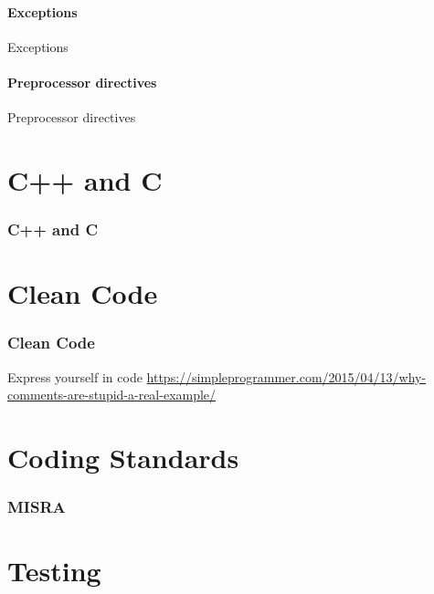 \documentclass{beamer}
\begin{document}
\subsection{Exceptions}
\begin{frame}{Exceptions}

\end{frame}

\subsection{Preprocessor directives}
\begin{frame}{Preprocessor directives}

\end{frame}


\part{C++ and C}
\section{C++ and C}
\begin{frame}

\end{frame}


\part{Clean Code}
\section{Clean Code}
\begin{frame}{Express yourself in code}
\url{https://simpleprogrammer.com/2015/04/13/why-comments-are-stupid-a-real-example/}
\end{frame}


\part{Coding Standards}
\section{MISRA}
\begin{frame}

\end{frame}


\part{Testing}
\end{document}
